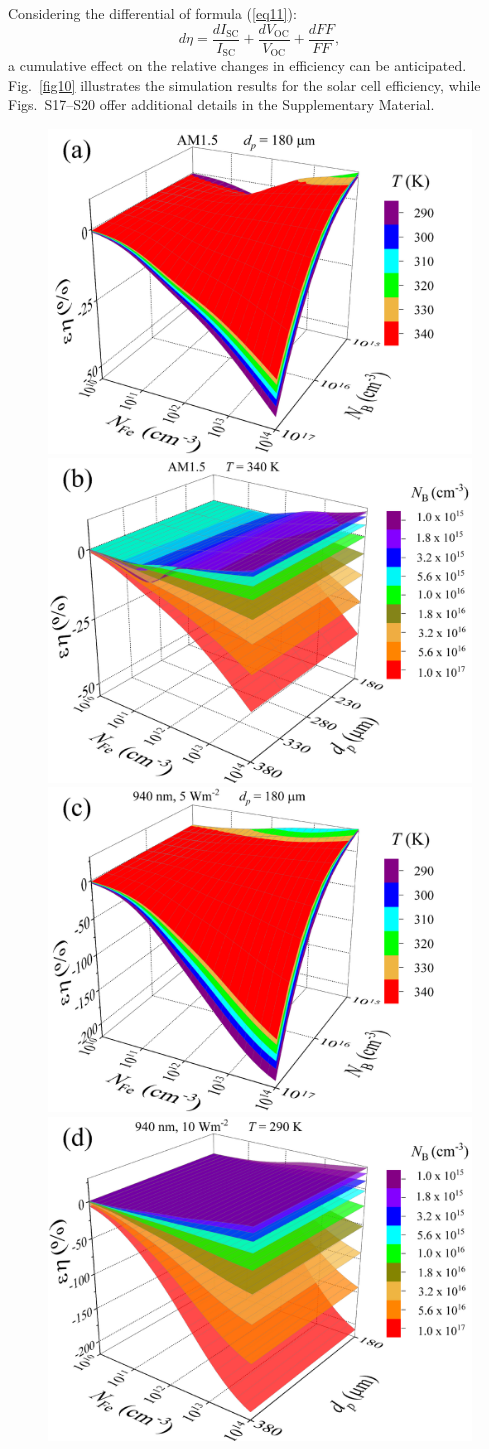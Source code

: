 \documentclass[a4paper,fleqn]{cas-sc}
\begin{document}
Considering the differential of formula (\ref{eq11}):
\begin{equation}
\label{eq12}
    d\eta = \frac{dI_\mathrm{SC}}{I_\mathrm{SC}}+\frac{dV_\mathrm{OC}}{V_\mathrm{OC}}+\frac{dF\!F}{F\!F},
\end{equation}
a cumulative effect on the relative changes in efficiency can be anticipated.
Fig.~\ref{fig10} illustrates the simulation results for the solar cell efficiency,
while Figs.~S17–S20 offer additional details in the Supplementary Material.


\begin{figure}
	\centering
     \includegraphics[width=0.49\linewidth]{Fig10a.png}
     \includegraphics[width=0.49\linewidth]{Fig10b.png}
     \includegraphics[width=0.49\linewidth]{Fig10c.png}
     \includegraphics[width=0.49\linewidth]{Fig10d.png}

\end{figure}
\end{document}
